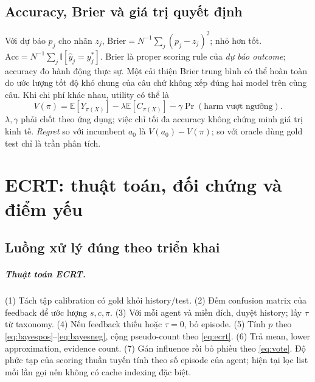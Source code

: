 \documentclass[11pt,a4paper,openany]{book}
\newcommand{\E}{\mathbb E}\newcommand{\Var}{\operatorname{Var}}\newcommand{\Cov}{\operatorname{Cov}}\newcommand{\Ind}{\mathbb I}\newcommand{\argmax}{\operatorname*{arg\,max}}\newcommand{\argmin}{\operatorname*{arg\,min}}
\newcommand{\repo}[1]{\path{#1}}
\begin{document}
\section{Accuracy, Brier và giá trị quyết định}
Với dự báo \(p_j\) cho nhãn \(z_j\), \(\mathrm{Brier}=N^{-1}\sum_j(p_j-z_j)^2\); nhỏ hơn tốt. \(\mathrm{Acc}=N^{-1}\sum_j\Ind[\hat y_j=y_j^*]\). Brier là proper scoring rule của \emph{dự báo outcome}; accuracy đo hành động thực sự. Một cải thiện Brier trung bình có thể hoàn toàn do ước lượng tốt độ khó chung của câu chứ không xếp đúng hai model trên cùng câu. Khi chi phí khác nhau, utility có thể là
\begin{equation}\label{eq:utility}V(\pi)=\E[Y_{\pi(X)}]-\lambda\E[C_{\pi(X)}]-\gamma\Pr(\text{harm vượt ngưỡng}).\end{equation}
\(\lambda,\gamma\) phải chốt theo ứng dụng; việc chỉ tối đa accuracy không chứng minh giá trị kinh tế. \emph{Regret} so với incumbent \(a_0\) là \(V(a_0)-V(\pi)\); so với oracle dùng gold test chỉ là trần phân tích.

\chapter{ECRT: thuật toán, đối chứng và điểm yếu}
\section{Luồng xử lý đúng theo triển khai}
\paragraph{Thuật toán ECRT.} (1) Tách tập calibration có gold khỏi history/test. (2) Đếm confusion matrix của feedback để ước lượng \(s,c,\pi\). (3) Với mỗi agent và miền đích, duyệt history; lấy \(\tau\) từ taxonomy. (4) Nếu feedback thiếu hoặc \(\tau=0\), bỏ episode. (5) Tính \(p\) theo \eqref{eq:bayespos}--\eqref{eq:bayesneg}, cộng pseudo-count theo \eqref{eq:ecrt}. (6) Trả mean, lower approximation, evidence count. (7) Gán influence rồi bỏ phiếu theo \eqref{eq:vote}. Độ phức tạp của scoring thuần tuyến tính theo số episode của agent; hiện tại \repo{score} lọc list mỗi lần gọi nên không có cache indexing đặc biệt.
\end{document}
